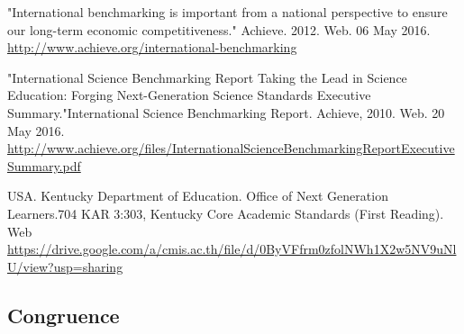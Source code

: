 \documentclass{report}
\begin{document}
\begin{evidence}
\item "International benchmarking is important from a national perspective to ensure our long-term economic competitiveness." Achieve. 2012. Web. 06 May 2016. \url{http://www.achieve.org/international-benchmarking}
\item "International Science Benchmarking Report Taking the Lead in Science Education: Forging Next-Generation Science Standards Executive Summary."International Science Benchmarking Report. Achieve, 2010. Web. 20 May 2016. \url{http://www.achieve.org/files/InternationalScienceBenchmarkingReportExecutiveSummary.pdf}
\item USA. Kentucky Department of Education. Office of Next Generation Learners.704 KAR 3:303, Kentucky Core Academic Standards (First Reading). Web \url{https://drive.google.com/a/cmis.ac.th/file/d/0ByVFfrm0zfolNWh1X2w5NV9uNlU/view?usp=sharing}
\end{evidence}

\subsection{Congruence}
\end{document}
